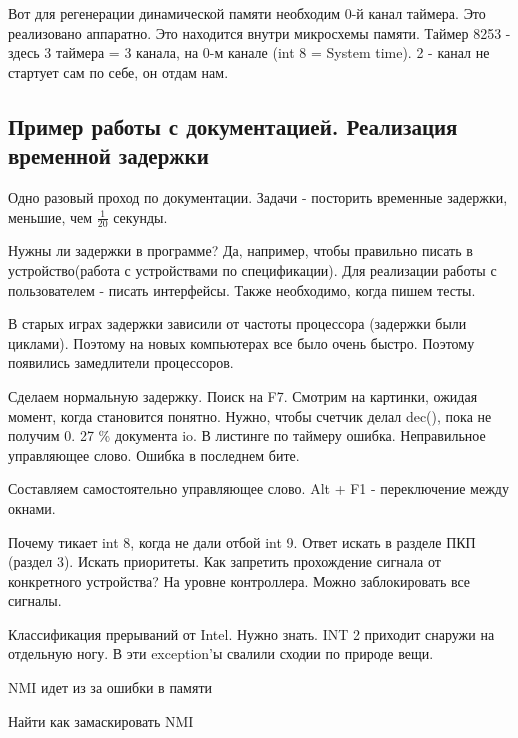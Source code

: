 Вот для регенерации динамической памяти необходим 0-й канал таймера. Это реализовано аппаратно. Это находится внутри микросхемы памяти. Таймер 8253 - здесь 3 таймера = 3 канала, на 0-м канале (int 8 = System time). 2 - канал не стартует сам по себе, он отдам нам. 
\subsection{Пример работы с документацией. Реализация временной задержки}
Одно разовый проход по документации. Задачи - посторить временные задержки, меньшие, чем $\frac{1}{20}$ секунды. 

Нужны ли задержки в программе? Да, например, чтобы правильно писать в устройство(работа с устройствами по спецификации). Для реализации работы с пользователем - писать интерфейсы. Также необходимо, когда пишем тесты. 

В старых играх задержки зависили от частоты процессора (задержки были циклами). Поэтому на новых компьютерах все было очень быстро. Поэтому появились замедлители процессоров. 

Сделаем нормальную задержку. Поиск на F7. Смотрим на картинки, ожидая момент, когда становится понятно. Нужно, чтобы счетчик делал dec(), пока не получим 0. 27 \% документа io.  В листинге по таймеру ошибка. Неправильное управляющее слово.  Ошибка в последнем бите. 

Составляем самостоятельно управляющее слово. Alt + F1 - переключение между окнами.

\begin{hw}Почему тикает int 8, когда не дали отбой int 9. Ответ искать в разделе ПКП (раздел 3). Искать приоритеты. Как запретить прохождение сигнала от конкретного устройства? На уровне контроллера. Можно заблокировать все сигналы.\end{hw}

\begin{hw}Классификация прерываний от Intel. Нужно знать. INT 2 приходит снаружи на отдельную ногу. В эти exception'ы свалили сходии по природе вещи.\end{hw}

NMI идет из за ошибки в памяти
\begin{hw} Найти как замаскировать NMI\end{hw} 